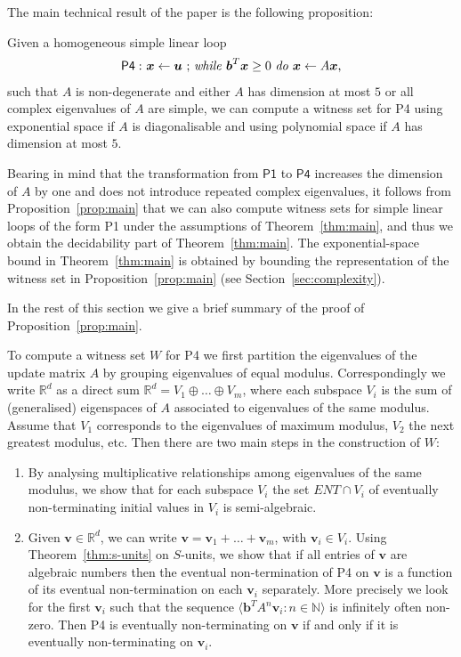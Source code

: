 The main technical result of the paper is the following proposition:
\begin{proposition}
Given a homogeneous simple linear loop
\begin{gather*}
\mathsf{P4:}\ \mbox{$\boldsymbol{x}\gets \boldsymbol{u}$ ;
\textit{while} $\boldsymbol{b}^T\boldsymbol{x} \geq 0$ \textit{do} $\boldsymbol{x}\leftarrow A\boldsymbol{x}$,}
\end{gather*}
such that $A$ is non-degenerate and either $A$ has dimension at most
$5$ or all complex eigenvalues of $A$ are simple,  we can compute a
witness set for \textsf{P4} using exponential space if $A$ is diagonalisable and using polynomial space if $A$ has dimension at most $5$.
\label{prop:main}
\end{proposition}

Bearing in mind that the transformation from $\mathsf{P1}$ to
$\mathsf{P4}$ increases the dimension of $A$ by one and does not
introduce repeated complex eigenvalues, it follows from
Proposition~\ref{prop:main} that we can also compute witness sets for
simple linear loops of the form \textsf{P1}
under the assumptions of Theorem~\ref{thm:main}, and thus we obtain
the decidability part of Theorem~\ref{thm:main}.  The
exponential-space bound in Theorem~\ref{thm:main} is obtained by
bounding the representation of the witness set in
Proposition~\ref{prop:main} (see Section~\ref{sec:complexity}).

In the rest of this section we give a brief summary of the proof of
Proposition~\ref{prop:main}.

To compute a witness set $W$ for \textsf{P4} we first partition the
eigenvalues of the update matrix $A$ by grouping eigenvalues of equal
modulus.  Correspondingly we write $\mathbb{R}^d$ as a direct sum
$\mathbb{R}^d = V_1 \oplus \ldots \oplus V_m$, where each subspace
$V_i$ is the sum of (generalised) eigenspaces of $A$ associated to
eigenvalues of the same modulus.  Assume that $V_1$ corresponds to the
eigenvalues of maximum modulus, $V_2$ the next greatest modulus,
etc.  Then there are two main steps in the construction of $W$:
\begin{enumerate}
\item
 By analysing multiplicative relationships among eigenvalues of the
 same modulus, we show that for each subspace $V_i$ the set
 $\mathit{ENT}\cap V_i$ of eventually non-terminating initial values
 in $V_i$ is semi-algebraic.
\item
Given $\boldsymbol{v} \in \mathbb{R}^d$, we can write
$\boldsymbol{v}=\boldsymbol{v}_1+\ldots+\boldsymbol{v}_m$, with
$\boldsymbol{v}_i \in V_i$.  Using Theorem~\ref{thm:s-units} on
$S$-units, we show that if all entries of $\boldsymbol{v}$ are
algebraic numbers then the eventual non-termination of \textsf{P4} on
$\boldsymbol{v}$ is a function of its eventual non-termination on each
$\boldsymbol{v}_i$ separately.  More precisely we look for the first
$\boldsymbol{v}_i$ such that the sequence $\langle
\boldsymbol{b}^TA^n\boldsymbol{v}_i : n \in \mathbb{N}\rangle$ is infinitely often non-zero. Then \textsf{P4} is eventually non-terminating on
$\boldsymbol{v}$ if and only if it is eventually non-terminating on
$\boldsymbol{v}_i$.
\end{enumerate}

